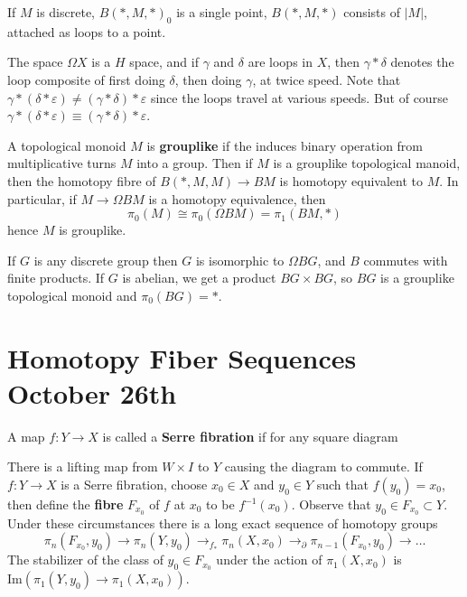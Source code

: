 \begin{example}
    If $M$ is discrete, $B(*,M,*)_0$ is a single point, $B(*,M,*)$ consists of $|M|$, attached as loops to a point.
\end{example}

The space $\Omega X$ is a $H$ space, and if $\gamma$ and $\delta$ are loops in $X$, then $\gamma * \delta$ denotes the loop composite of first doing $\delta$, then doing $\gamma$, at twice speed. Note that $\gamma * (\delta * \varepsilon) \neq (\gamma * \delta) * \varepsilon$ since the loops travel at various speeds. But of course $\gamma * (\delta * \varepsilon) \equiv (\gamma * \delta) * \varepsilon$.

A topological monoid $M$ is {\bf grouplike} if the induces binary operation from multiplicative turns $M$ into a group. Then if $M$ is a grouplike topological manoid, then the homotopy fibre of $B(*,M,M) \to BM$ is homotopy equivalent to $M$. In particular, if $M \to \Omega BM$ is a homotopy equivalence, then
%
\[ \pi_0(M) \cong \pi_0(\Omega BM) = \pi_1(BM,*) \]
%
hence $M$ is grouplike.

If $G$ is any discrete group then $G$ is isomorphic to $\Omega BG$, and $B$ commutes with finite products. If $G$ is abelian, we get a product $BG \times BG$, so $BG$ is a grouplike topological monoid and $\pi_0(BG) = *$.

\section{Homotopy Fiber Sequences October 26th}

A map $f: Y \to X$ is called a {\bf Serre fibration} if for any square diagram
%
\begin{center}
\end{center}
%
There is a lifting map from $W \times I$ to $Y$ causing the diagram to commute. If $f: Y \to X$ is a Serre fibration, choose $x_0 \in X$ and $y_0 \in Y$ such that $f(y_0) = x_0$, then define the {\bf fibre} $F_{x_0}$ of $f$ at $x_0$ to be $f^{-1}(x_0)$. Observe that $y_0 \in F_{x_0} \subset Y$. Under these circumstances there is a long exact sequence of homotopy groups
%
\[ \pi_n(F_{x_0}, y_0) \to \pi_n(Y,y_0) \to_{f_*} \pi_n(X,x_0) \to_{\partial} \pi_{n-1}(F_{x_0}, y_0) \to \dots \]
%
The stabilizer of the class of $y_0 \in F_{x_0}$ under the action of $\pi_1(X,x_0)$ is $\text{Im}(\pi_1(Y,y_0) \to \pi_1(X,x_0))$.

